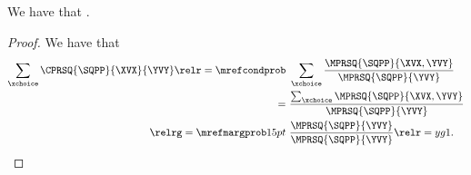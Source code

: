 \begin{proposition}
  We have that \sqcprobsumoneprop.%
\end{proposition}

\begin{proof}
  We have that
  \begin{align*}
    \sum_{\xchoice}\CPRSQ{\SQPP}{\XVX}{\YVY} \relr = {\mrefcondprob} &\ \sum_{\xchoice}\frac{\MPRSQ{\SQPP}{\XVX, \YVY}}{\MPRSQ{\SQPP}{\YVY}}\\
    = &\ \frac{\sum_{\xchoice}\MPRSQ{\SQPP}{\XVX, \YVY}}{\MPRSQ{\SQPP}{\YVY}}\\
    \relrg = {\mrefmargprob} 15pt &\ \frac{\MPRSQ{\SQPP}{\YVY}}{\MPRSQ{\SQPP}{\YVY}} \relr = yg 1.
  \end{align*}
\end{proof}
